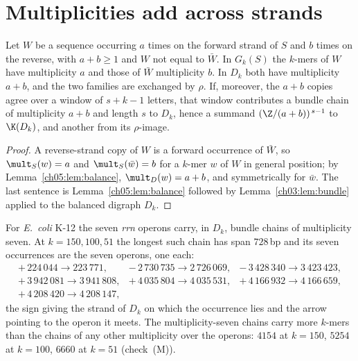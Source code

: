 \section{Multiplicities add across strands}\label{ch05:sec:merge}

\begin{theorem}\label{ch05:thm:merge}
Let $W$ be a sequence occurring $a$ times on the forward strand of $S$ and $b$ times on the
reverse, with $a+b\ge1$ and $W$ not equal to $\bar W$. In $G_k(S)$ the $k$-mers of $W$
have multiplicity $a$ and those of $\bar W$ multiplicity $b$. In $D_k$ both have
multiplicity $a+b$, and the two families are exchanged by $\rho$. If, moreover, the $a+b$
copies agree over a window of $s+k-1$ letters, that window contributes a bundle chain of
multiplicity $a+b$ and length $s$ to $D_k$, hence a summand $(\Z/(a+b))^{\,s-1}$ to
$\K(D_k)$, and another from its $\rho$-image.
\end{theorem}

\begin{proof}
A reverse-strand copy of $W$ is a forward occurrence of $\bar W$, so
$\mult_S(w)=a$ and $\mult_S(\bar w)=b$ for a $k$-mer $w$ of $W$ in general position; by
Lemma~\ref{ch05:lem:balance}, $\mult_D(w)=a+b$, and symmetrically for $\bar w$. The last
sentence is Lemma~\ref{ch05:lem:balance} followed by Lemma~\ref{ch03:lem:bundle} applied to the
balanced digraph $D_k$.
\end{proof}

\begin{corollary}\label{ch05:cor:rrna}
For \emph{E.\ coli} K-12 the seven \emph{rrn} operons carry, in $D_k$, bundle chains of
multiplicity seven. At $k=150,100,51$ the longest such chain has span $728$\,bp and its
seven occurrences are the seven operons, one each:
\[
\begin{array}{lll}
+\,224\,044\to223\,771, & -\,2\,730\,735\to2\,726\,069, & -\,3\,428\,340\to3\,423\,423,\\
+\,3\,942\,081\to3\,941\,808, & +\,4\,035\,804\to4\,035\,531, & +\,4\,166\,932\to4\,166\,659,\\
+\,4\,208\,420\to4\,208\,147, & &
\end{array}
\]
the sign giving the strand of $D_k$ on which the occurrence lies and the arrow pointing to
the operon it meets. The multiplicity-seven chains carry more $k$-mers than the chains of
any other multiplicity over the operons: $4154$ at $k=150$, $5254$ at $k=100$, $6660$ at
$k=51$ (check~(M)).
\end{corollary}


